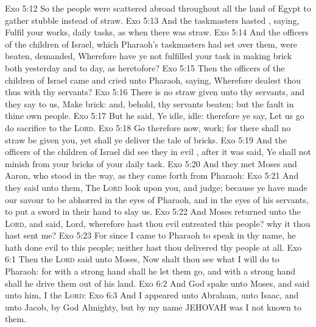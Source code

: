 \vs Exo 5:12 So the people were scattered abroad throughout all the land of Egypt to gather stubble instead of straw.
\vs Exo 5:13 And the taskmasters hasted , saying, Fulfil your works,  daily tasks, as when there was straw.
\vs Exo 5:14 And the officers of the children of Israel, which Pharaoh's taskmasters had set over them, were beaten,  demanded, Wherefore have ye not fulfilled your task in making brick both yesterday and to day, as heretofore?
\vs Exo 5:15 Then the officers of the children of Israel came and cried unto Pharaoh, saying, Wherefore dealest thou thus with thy servants?
\vs Exo 5:16 There is no straw given unto thy servants, and they say to us, Make brick: and, behold, thy servants  beaten; but the fault  in thine own people.
\vs Exo 5:17 But he said, Ye  idle,  idle: therefore ye say, Let us go  do sacrifice to the \textsc{Lord}.
\vs Exo 5:18 Go therefore now,  work; for there shall no straw be given you, yet shall ye deliver the tale of bricks.
\vs Exo 5:19 And the officers of the children of Israel did see  they  in evil , after it was said, Ye shall not minish  from your bricks of your daily task.
\vs Exo 5:20 And they met Moses and Aaron, who stood in the way, as they came forth from Pharaoh:
\vs Exo 5:21 And they said unto them, The \textsc{Lord} look upon you, and judge; because ye have made our savour to be abhorred in the eyes of Pharaoh, and in the eyes of his servants, to put a sword in their hand to slay us.
\vs Exo 5:22 And Moses returned unto the \textsc{Lord}, and said, Lord, wherefore hast thou  evil entreated this people? why  it  thou hast sent me?
\vs Exo 5:23 For since I came to Pharaoh to speak in thy name, he hath done evil to this people; neither hast thou delivered thy people at all.
\vs Exo 6:1 Then the \textsc{Lord} said unto Moses, Now shalt thou see what I will do to Pharaoh: for with a strong hand shall he let them go, and with a strong hand shall he drive them out of his land.
\vs Exo 6:2 And God spake unto Moses, and said unto him, I  the \textsc{Lord}:
\vs Exo 6:3 And I appeared unto Abraham, unto Isaac, and unto Jacob, by  God Almighty, but by my name JEHOVAH was I not known to them.
